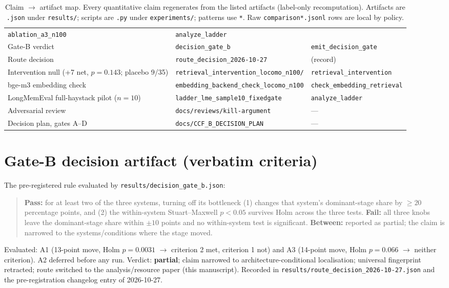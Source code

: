\documentclass[11pt]{article}
\begin{document}
\begin{table}[p]
\begin{tabular}{@{}p{6.0cm}p{5.4cm}p{4.0cm}@{}}
\texttt{ablation\_a3\_n100} & \texttt{analyze\_ladder} \\
Gate-B verdict & \texttt{decision\_gate\_b} & \texttt{emit\_decision\_gate} \\
Route decision & \texttt{route\_decision\_2026-10-27} & (record) \\
Intervention null (+7 net, $p=0.143$; placebo 9/35) &
\texttt{retrieval\_intervention\_locomo\_n100/} &
\texttt{retrieval\_intervention} \\
bge-m3 embedding check & \texttt{embedding\_backend\_check\_locomo\_n100} &
\texttt{check\_embedding\_retrieval} \\
LongMemEval full-haystack pilot ($n=10$) &
\texttt{ladder\_lme\_sample10\_fixedgate} & \texttt{analyze\_ladder} \\
Adversarial review & \texttt{docs/reviews/kill-argument} & --- \\
Decision plan, gates A--D & \texttt{docs/CCF\_B\_DECISION\_PLAN} & --- \\
\bottomrule
\end{tabular}
\caption{Claim $\to$ artifact map. Every quantitative claim regenerates from
the listed artifacts (label-only recomputation). Artifacts are \texttt{.json}
under \texttt{results/}; scripts are \texttt{.py} under \texttt{experiments/};
patterns use \texttt{*}. Raw \texttt{comparison*.jsonl} rows are local by
policy.}
\label{tab:claimmap}
\end{table}

\section{Gate-B decision artifact (verbatim criteria)}
\label{app:gateb}

The pre-registered rule evaluated by \texttt{results/decision\_gate\_b.json}:

\begin{quote}
\textbf{Pass:} for at least two of the three systems, turning off its
bottleneck (1) changes that system's dominant-stage share by
$\geq 20$ percentage points, and (2) the within-system Stuart--Maxwell
$p < 0.05$ survives Holm across the three tests. \textbf{Fail:} all three
knobs leave the dominant-stage share within $\pm 10$ points and no
within-system test is significant. \textbf{Between:} reported as partial; the
claim is narrowed to the systems/conditions where the stage moved.
\end{quote}

Evaluated: A1 (13-point move, Holm $p = 0.0031$ $\to$ criterion 2 met,
criterion 1 not) and A3 (14-point move, Holm $p = 0.066$ $\to$ neither
criterion). A2 deferred before any run. Verdict: \textbf{partial}; claim
narrowed to architecture-conditional localisation; universal fingerprint
retracted; route switched to the analysis/resource paper (this manuscript).
Recorded in \texttt{results/route\_decision\_2026-10-27.json} and the
pre-registration changelog entry of 2026-10-27.
\end{document}
